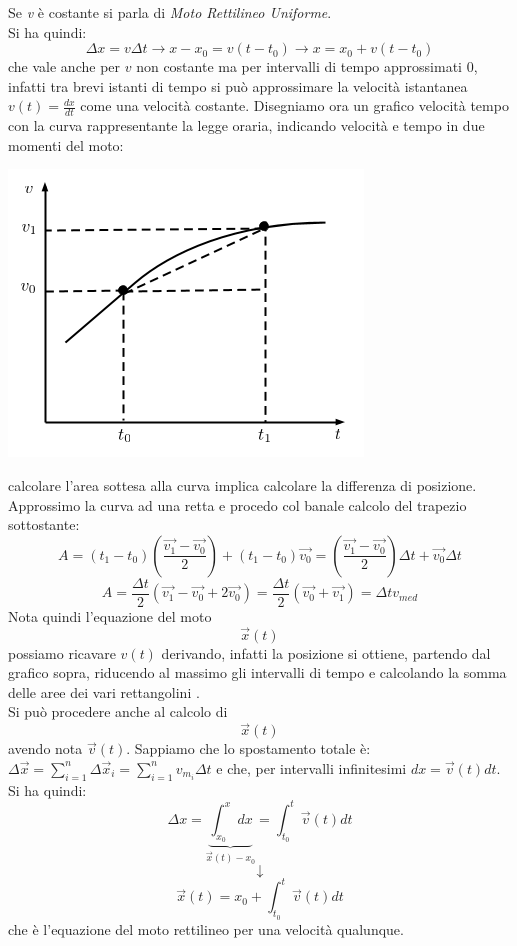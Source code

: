 \documentclass[a4paper,12pt, oneside]{book}
\begin{document}
Se \textit{v} è costante si parla di \textit{Moto Rettilineo Uniforme}. \\
Si ha quindi:
$$\Delta x = v\Delta t\to x-x_0=v(t-t_0)\to x=x_0+v(t-t_0)$$
che vale anche per $v$ non costante ma per intervalli di tempo approssimati 0, infatti tra brevi istanti di tempo si può approssimare la velocità istantanea $v(t)=\frac{dx}{dt}$ come una velocità costante. Disegniamo ora un grafico velocità tempo con la curva rappresentante la legge oraria, indicando velocità e tempo in due momenti del moto:
\begin{center}
\includegraphics[scale=0.5]{img/gra.png}
\end{center}
calcolare l'area sottesa alla curva implica calcolare la differenza di posizione. Approssimo la curva ad una retta e procedo col banale calcolo del trapezio sottostante:
$$A=(t_1-t_0)(\frac{\vec{v_1}-\vec{v_0}}{2})+(t_1-t_0
)\vec{v_0}=(\frac{\vec{v_1}-\vec{v_0}}{2})\Delta t+\vec{v_0}\Delta t$$
$$A=\frac{\Delta t}{2}(\vec{v_1}-\vec{v_0}+2\vec{v_0})=\frac{\Delta t}{2}(\vec{v_0}+\vec{v_1})=\Delta t v_{med}$$
Nota quindi l'equazione del moto $$\vec{x}(t)$$ possiamo ricavare $v(t)$ derivando, infatti la posizione si ottiene, partendo dal grafico sopra, riducendo al massimo gli intervalli di tempo e calcolando la somma delle aree dei vari rettangolini .\\
Si può procedere anche al calcolo di $$\vec{x}(t)$$ avendo nota $\vec{v}(t)$. Sappiamo che lo spostamento totale è: $\Delta \vec{x}=\sum_{i=1}^n \Delta \vec{x}_i=\sum_{i=1}^n v_{m_i} \Delta t$ e che, per intervalli infinitesimi $dx=\vec{v}(t) dt$. Si ha quindi:
$$\Delta x=\underbrace{\int_{x_0}^x dx}_{\vec{x}(t)-x_0}=\int_{t_0}^t \vec{v}(t) dt$$
$$\downarrow$$
$$\vec{x}(t)=x_0+\int_{t_0}^t \vec{v}(t) dt$$
che è l'equazione del moto rettilineo per una velocità qualunque.\\
\end{document}
